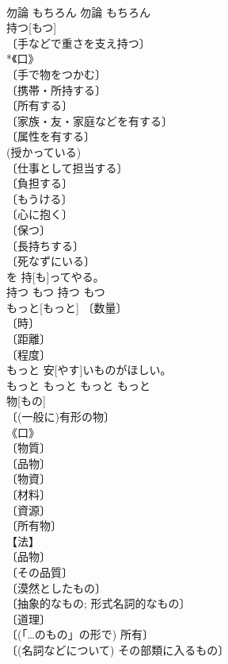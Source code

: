 \documentclass[8pt]{extreport}
\begin{document}
\begin{CJK}{UTF8}{min}
\\	勿論	もちろん	勿論	もちろん	
\\	持つ[もつ]	
\\	〔手などで重さを支え持つ〕 
\\	*《口》 
\\	〔手で物をつかむ〕 
\\	〔携帯・所持する〕 
\\	〔所有する〕 
\\	〔家族・友・家庭などを有する〕 
\\	〔属性を有する〕 
\\	(授かっている) 
\\	〔仕事として担当する〕 
\\	〔負担する〕 
\\	〔もうける〕 
\\	〔心に抱く〕 
\\	〔保つ〕 
\\	〔長持ちする〕 
\\	〔死なずにいる〕 
\\	[⇒もたせる２ 
\\	物[もの]を 持[も]ってやる。	
\\	持つ	もつ	持つ	もつ	
\\	もっと[もっと]	〔数量〕 
\\	〔時〕 
\\	〔距離〕 
\\	〔程度〕 
\\	もっと 安[やす]いものがほしい。	
\\	もっと	もっと	もっと	もっと	
\\	物[もの]	
\\	〔(一般に)有形の物〕 
\\	《口》 
\\	〔物質〕 
\\	〔品物〕 
\\	〔物資〕 
\\	〔材料〕 
\\	〔資源〕 
\\	〔所有物〕 
\\	【法】 
\\	〔品物〕 
\\	〔その品質〕 
\\	〔漠然としたもの〕 
\\	〔抽象的なもの; 形式名詞的なもの〕 
\\	〔道理〕 
\\	〔(「…のもの」の形で) 所有〕 
\\	〔(名詞などについて) その部類に入るもの〕 

\end{CJK}
\end{document}
